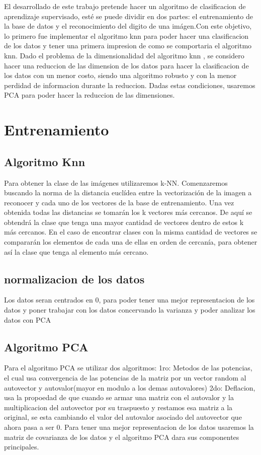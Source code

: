 El desarrollado de este trabajo pretende hacer un algoritmo de clasificacion de
aprendizaje supervisado, esté se puede dividir en dos partes: el entrenamiento
de la base de datos y el reconocimiento del digito de una imágen.Con este
objetivo, lo primero fue implementar el algoritmo knn para poder hacer una
clasificacion de los datos y tener una primera impresion de como se comportaria
el algoritmo knn. Dado el problema de la dimensionalidad del algoritmo knn , se
considero hacer una reduccion de las dimension de los datos para hacer la
clasificacion de los datos con un menor costo, siendo una algoritmo robusto y
con la menor perdidad de informacion durante la reduccion. Dadas estas
condiciones, usaremos PCA para poder hacer la reduccion de las dimensiones.  


\section{Entrenamiento}

\subsection{Algoritmo Knn}
Para obtener la clase de las imágenes utilizaremos k-NN.
Comenzaremos buscando la norma de la distancia euclídea entre la vectorización de la imagen a reconocer y cada uno de los vectores de la base de entrenamiento.
Una vez obtenida todas las distancias se tomarán los k vectores más cercanos. De aquí se obtendrá la clase que tenga una mayor cantidad de vectores dentro de estos k más cercanos. En el caso de encontrar clases con la misma cantidad de vectores se compararán los elementos de cada una de ellas en orden de cercanía, para obtener así la clase que tenga al elemento más cercano.

\subsection{normalizacion de los datos}
Los datos seran centrados en 0, para poder tener una mejor representacion de los
datos y poner trabajar con los datos concervando la varianza y poder analizar
los datos con PCA

\subsection{Algoritmo PCA}
Para el algoritmo PCA se utilizar dos algoritmos:
1ro: Metodos de las potencias, el cual usa convergencia de las potencias de
la matriz por un vector random al autovector y  autovalor(mayor en modulo a los
demas autovalores)
2do: Deflacion, usa la propoedad de que cuando se armar una matriz con el autovalor
y la multiplicacion del autovector por su traspuesto y restamos esa matriz a la
original, se esta cambiando el valor del autovalor asociado del autovector que
ahora pasa a ser 0.
Para tener una mejor representacion de los datos usaremos la matriz de
covarianza de los datos y el algoritmo PCA dara sus componentes principales. 

